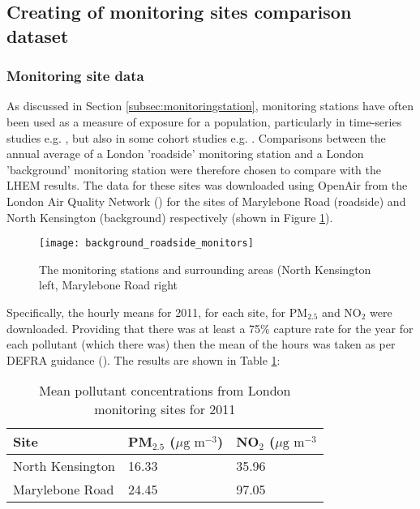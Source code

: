     \subsection{Creating of monitoring sites comparison dataset}
    \label{sec:creating_monitoring_site_dataset}

        \subsubsection{Monitoring site data}
        \label{sec:monitoring_site_data}

As discussed in Section \ref{subsec:monitoringstation}, monitoring stations have often been used as a measure of exposure for a population, particularly in time-series studies e.g. \cite{Atkinson2010}, but also in some cohort studies e.g. \cite{Dockery1993}. Comparisons between the annual average of a London 'roadside' monitoring station and a London 'background' monitoring station were therefore chosen to compare with the LHEM results. The data for these sites was downloaded using OpenAir from the London Air Quality Network (\cite{LondonAir}) for the sites of Marylebone Road (roadside) and North Kensington (background) respectively (shown in Figure \ref{fig:background_roadside_monitors}).

\begin{figure}[H]
\centering
\texttt{[image: background\_roadside\_monitors]}
\caption{The monitoring stations and surrounding areas (North Kensington left, Marylebone Road right}
\label{fig:background_roadside_monitors}
\end{figure}

Specifically, the hourly means for 2011, for each site, for PM$_{2.5}$ and NO$_{2}$ were downloaded. Providing that there was at least a 75\% capture rate for the year for each pollutant (which there was) then the mean of the hours was taken as per DEFRA guidance (\cite{DEFRA2009}). The results are shown in Table \ref{tab:mean_monitoring_site_concentrations}:

\begin{table}[H]
\centering
    \begin{tabular}{ | l | l | l |}
    \hline 
     \bfseries{Site} & \bfseries{PM$_{2.5}$ ($\mu \text{g m}^{-3}$)} & \bfseries{NO$_{2}$ ($\mu \text{g m}^{-3}$}  \\ \hline
     North Kensington & 16.33 & 35.96\\ \hline
     Marylebone Road & 24.45 & 97.05\\ \hline
    \end{tabular}
\caption{Mean pollutant concentrations from London monitoring sites for 2011}
\label{tab:mean_monitoring_site_concentrations}
\end{table}

